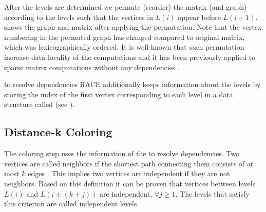 After the levels are determined we permute (reorder) the matrix (and graph) according
to the levels such that the vertices in $L(i)$ appear before $L(i+1)$.  
shows the graph and matrix after applying the permutation. Note that the vertex numbering 
in the permuted graph has changed compared to original matrix, which was lexicographically ordered.
It is well-known  that such permutation increase data locality
of the computations and it has been previously applied to sparse matrix
computations without any dependencies \cite{RCM_Sparse_computation}.

\Inorder to resolve dependencies \acrshort{RACE} additionally keeps information
about the levels by storing the index of the first vertex corresponding
to each level in a data structure called \levelPtr (see ).

\subsection{Distance-k Coloring}
The \DK coloring step uses the information of the \levelPtr to resolve
dependencies. Two vertices are called \DK neighbors if the shortest path connecting 
them consists of at most $k$ edges \cite{dist_k_def}. This implies two vertices
 are \DK independent if they are not \DK neighbors. Based on this definition
 it can be proven that vertices between levels $L(i)$ and $L(i \pm (k+j))$ are
 \DK independent, $\forall j\ge1$. The levels that satisfy this criterion
 are called \DK independent levels.
 
